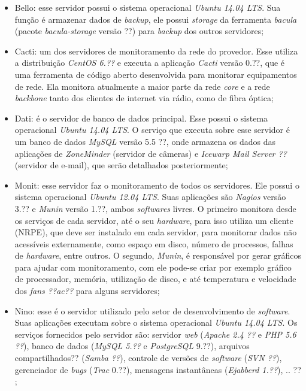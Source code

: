 \begin{itemize}
 \item Bello: esse servidor possui o sistema operacional \textit{Ubuntu 14.04 \ac{LTS}}. Sua função é armazenar dados de \textit{backup}, ele 
 possui \textit{storage} da ferramenta \textit{bacula} (pacote \textit{bacula-storage} versão ??) para \textit{backup} dos outros servidores;
 
 \item Cacti: um dos servidores de monitoramento da rede do provedor. Esse utiliza a distribuição \textit{CentOS 6.??} e executa a aplicação
 \textit{Cacti} versão 0.??, que é uma ferramenta de código aberto desenvolvida para monitorar equipamentos de rede. Ela monitora atualmente a 
 maior parte da rede \textit{core} e a rede \textit{backbone} tanto dos clientes de internet via rádio, como de fibra óptica;
 
 \item Dati: é o servidor de banco de dados principal. Esse possui o sistema operacional \textit{Ubuntu 14.04 \ac{LTS}}. O serviço que executa
 sobre esse servidor é um banco de dados \textit{MySQL} versão 5.5 ??, onde armazena os dados das aplicações de \textit{ZoneMinder} (servidor 
 de câmeras) e \textit{Icewarp Mail Server ??} (servidor de e-mail), que serão detalhados posteriormente;
 
 \item Monit: esse servidor faz o monitoramento de todos os servidores. Ele possui o sistema operacional \textit{Ubuntu 12.04 \ac{LTS}}.
 Suas aplicações são \textit{Nagios} versão 3.?? e \textit{Munin} versão 1.??, ambos \textit{softwares} livres. O primeiro monitora desde os 
 serviços de cada servidor, até o seu \textit{hardware}, para isso utiliza um cliente (\ac{NRPE}), que deve ser instalado em cada servidor, para 
 monitorar dados não acessíveis externamente, como espaço em disco, número de processos, falhas de \textit{hardware}, entre outros. O segundo, 
 \textit{Munin}, é responsável por gerar gráficos para ajudar com monitoramento, com ele pode-se criar por exemplo gráfico de processador, 
 memória, utilização de disco, e até temperatura e velocidade dos \textit{fans ??ac??} para alguns servidores;
 
 \item Nino: esse é o servidor utilizado pelo setor de desenvolvimento de \textit{software}. Suas aplicações executam sobre o sistema operacional
 \textit{Ubuntu 14.04 \ac{LTS}}. Os serviços fornecidos pelo servidor são: servidor \textit{web} (\textit{Apache 2.4 ??} e 
 \textit{\ac{PHP} 5.6 ??}), banco de dados (\textit{MySQL 5.??} e \textit{PostgreSQL} 9.??), arquivos compartilhados?? (\textit{Samba ??}), 
 controle de versões de \textit{software} (\textit{\ac{SVN} ??}), gerenciador de \textit{bugs} (\textit{Trac} 0.??), mensagens instantâneas 
 (\textit{Ejabberd 1.??}), .. ?? ;
 

\end{itemize}
